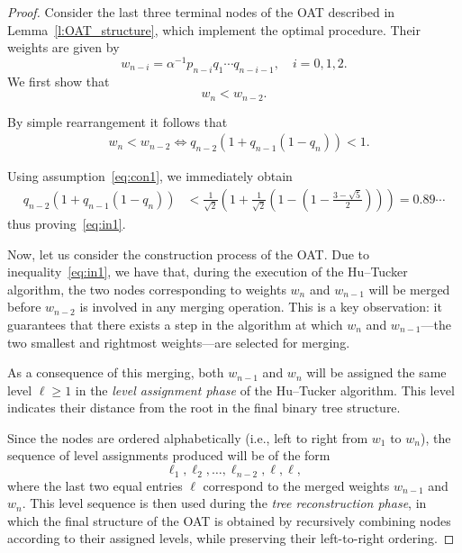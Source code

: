 \documentclass[10pt,a4paper]{amsart}
\begin{document}
\begin{proof}
Consider the last three terminal nodes of the OAT described in Lemma~\ref{l:OAT_structure}, which implement the optimal procedure. Their weights are given by
\[
w_{n-i} = \alpha^{-1} p_{n-i} q_1 \cdots q_{n-i-1}, \quad i = 0, 1, 2.
\]
We first show that
\begin{equation}
\label{eq:in1}
w_n < w_{n-2}.
\end{equation}

By simple rearrangement it follows that
\begin{align*}\label{e:condition_on_last_weights}
&
w_n<w_{n-2}\Longleftrightarrow
    q_{n-2}(1+q_{n-1}(1-q_n))<1.
\end{align*}

Using assumption~\eqref{eq:con1}, we immediately obtain
\begin{align*}
q_{n-2}\left(1 + q_{n-1}(1 - q_n)\right)
&< \frac{1}{\sqrt{2}} \left(1 + \frac{1}{\sqrt{2}}\left(1 - \left(1 - \frac{3 - \sqrt{5}}{2}\right)\right)\right)=0.89\cdots
\end{align*}
thus proving~\eqref{eq:in1}.


Now, let us consider the construction process of the OAT. Due to inequality~\eqref{eq:in1}, we have that, during the execution of the Hu--Tucker algorithm, the two nodes corresponding to weights \( w_n \) and \( w_{n-1} \) will be merged before \( w_{n-2} \) is involved in any merging operation. This is a key observation: it guarantees that there exists a step in the algorithm at which \( w_n \) and \( w_{n-1} \)---the two smallest and rightmost weights---are selected for merging.

As a consequence of this merging, both \( w_{n-1} \) and \( w_n \) will be assigned the same level \( \ell \geq 1 \) in the \emph{level assignment phase} of the Hu--Tucker algorithm. This level indicates their distance from the root in the final binary tree structure.

Since the nodes are ordered alphabetically (i.e., left to right from \( w_1 \) to \( w_n \)), the sequence of level assignments produced will be of the form
\[
\ell_1, \ell_2, \dots, \ell_{n-2}, \ell, \ell,
\]
where the last two equal entries \( \ell \) correspond to the merged weights \( w_{n-1} \) and \( w_n \). This level sequence is then used during the \emph{tree reconstruction phase}, in which the final structure of the OAT is obtained by recursively combining nodes according to their assigned levels, while preserving their left-to-right ordering.


\end{proof}
\end{document}
